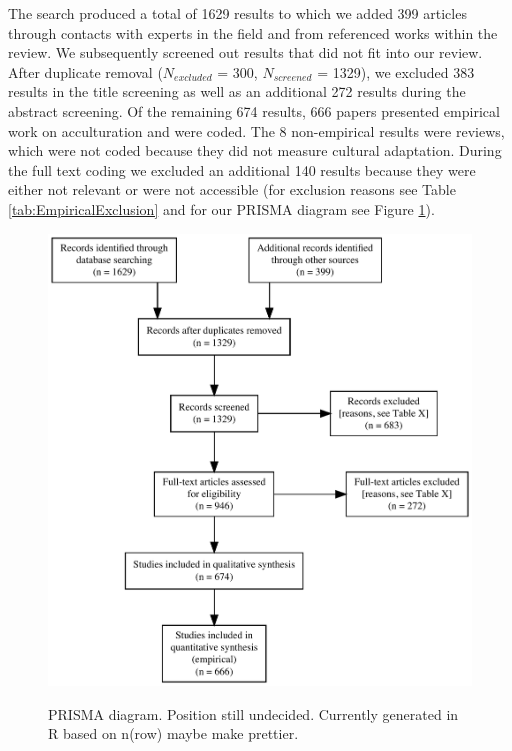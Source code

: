 The search produced a total of 1629 results to which we added 399
articles through contacts with experts in the field and from referenced
works within the review. We subsequently screened out results that did
not fit into our review. After duplicate removal (\(N_{excluded}\) =
300, \(N_{screened}\) = 1329), we excluded 383 results in the title
screening as well as an additional 272 results during the abstract
screening. Of the remaining 674 results, 666 papers presented empirical
work on acculturation and were coded. The 8 non-empirical results were
reviews, which were not coded because they did not measure cultural
adaptation. During the full text coding we excluded an additional 140
results because they were either not relevant or were not accessible
(for exclusion reasons see Table \ref{tab:EmpiricalExclusion} and for
our PRISMA diagram see Figure \ref{fig:PRISMA}).

\begin{figure}[h]
\centering
\caption{PRISMA diagram. Position still undecided. Currently generated in R based on n(row) maybe make prettier.}
\includegraphics[width=\textwidth]{Figures/PRISMA}
\label{fig:PRISMA}
\end{figure}



